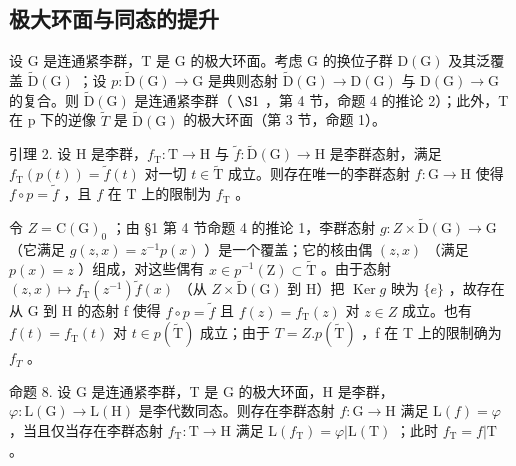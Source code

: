 \subsection{极大环面与同态的提升}

设 G 是连通紧李群，T 是 G 的极大环面。考虑 G 的换位子群 \(\mathrm{D}(\mathrm{G})\) 及其泛覆盖 \(\tilde{\mathrm{D}}(\mathrm{G})\) ；设 \(p: \tilde{\mathrm{D}}(\mathrm{G}) \to \mathrm{G}\) 是典则态射 \(\tilde{\mathrm{D}}(\mathrm{G}) \to \mathrm{D}(\mathrm{G})\) 与 \(\mathrm{D}(\mathrm{G}) \to \mathrm{G}\) 的复合。则 \(\tilde{\mathrm{D}}(\mathrm{G})\) 是连通紧李群（ \(\S1\) ，第 4 节，命题 4 的推论 2）；此外，T 在 p 下的逆像 \(\tilde{T}\) 是 \(\tilde{\mathrm{D}}(\mathrm{G})\) 的极大环面（第 3 节，命题 1）。

引理 2. 设 H 是李群，\(f_{\mathrm{T}}: \mathrm{T} \to \mathrm{H}\) 与 \(\tilde{f}: \tilde{\mathrm{D}}(\mathrm{G}) \to \mathrm{H}\) 是李群态射，满足 \(f_{\mathrm{T}}(p(t)) = \tilde{f}(t)\) 对一切 \(t \in \tilde{\mathrm{T}}\) 成立。则存在唯一的李群态射 \(f: \mathrm{G} \to \mathrm{H}\) 使得 \(f \circ p = \tilde{f}\) ，且 \(f\) 在 \(\mathrm{T}\) 上的限制为 \(f_{\mathrm{T}}\) 。

令 \(Z = \mathrm{C}(\mathrm{G})_{0}\) ；由 §1 第 4 节命题 4 的推论 1，李群态射 \(g: Z \times \tilde{\mathrm{D}}(\mathrm{G}) \to \mathrm{G}\) （它满足 \(g(z, x) = z^{-1} p(x)\) ）是一个覆盖；它的核由偶 \((z, x)\) （满足 \(p(x) = z\) ）组成，对这些偶有 \(x \in p^{-1}(\mathrm{Z}) \subset \tilde{\mathrm{T}}\) 。由于态射 \((z, x) \mapsto f_{\mathrm{T}}(z^{-1}) \tilde{f}(x)\) （从 \(Z \times \tilde{\mathrm{D}}(\mathrm{G})\) 到 H）把 \(\operatorname{Ker} g\) 映为 \(\{e\}\) ，故存在从 G 到 H 的态射 f 使得 \(f \circ p = \tilde{f}\) 且 \(f(z) = f_{\mathrm{T}}(z)\) 对 \(z \in Z\) 成立。也有 \(f(t) = f_{\mathrm{T}}(t)\) 对 \(t \in p(\tilde{\mathrm{T}})\) 成立；由于 \(T = Z.p(\tilde{\mathrm{T}})\) ，f 在 T 上的限制确为 \(f_{T}\) 。

命题 8. 设 G 是连通紧李群，T 是 G 的极大环面，H 是李群，\(\varphi : \mathrm{L}(\mathrm{G}) \to \mathrm{L}(\mathrm{H})\) 是李代数同态。则存在李群态射 \(f: \mathrm{G} \to \mathrm{H}\) 满足 \(\mathrm{L}(f) = \varphi\) ，当且仅当存在李群态射 \(f_{\mathrm{T}}: \mathrm{T} \to \mathrm{H}\) 满足 \(\mathrm{L}(f_{\mathrm{T}}) = \varphi | \mathrm{L}(\mathrm{T})\) ；此时 \(f_{\mathrm{T}} = f | \mathrm{T}\) 。

